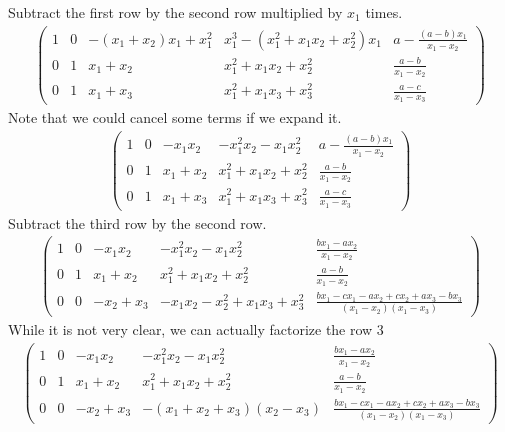 Subtract the first row by the second row multiplied by $ x_1 $ times.
\begin{eqnarray*}
\left(\begin{array}{rrrr|r}
1 & 0 & -{\left(x_{1} + x_{2}\right)} x_{1} + x_{1}^{2} & x_{1}^{3} - {\left(x_{1}^{2} + x_{1} x_{2} + x_{2}^{2}\right)} x_{1} & a - \frac{{\left(a - b\right)} x_{1}}{x_{1} - x_{2}} \\
0 & 1 & x_{1} + x_{2} & x_{1}^{2} + x_{1} x_{2} + x_{2}^{2} & \frac{a - b}{x_{1} - x_{2}} \\
0 & 1 & x_{1} + x_{3} & x_{1}^{2} + x_{1} x_{3} + x_{3}^{2} & \frac{a - c}{x_{1} - x_{3}}
\end{array}\right)
\end{eqnarray*}
Note that we could cancel some terms if we expand it.
\begin{eqnarray*}
\left(\begin{array}{rrrr|r}
1 & 0 & -x_{1} x_{2} & -x_{1}^{2} x_{2} - x_{1} x_{2}^{2} & a - \frac{{\left(a - b\right)} x_{1}}{x_{1} - x_{2}} \\
0 & 1 & x_{1} + x_{2} & x_{1}^{2} + x_{1} x_{2} + x_{2}^{2} & \frac{a - b}{x_{1} - x_{2}} \\
0 & 1 & x_{1} + x_{3} & x_{1}^{2} + x_{1} x_{3} + x_{3}^{2} & \frac{a - c}{x_{1} - x_{3}}
\end{array}\right)
\end{eqnarray*}
Subtract the third row by the second row.
\begin{eqnarray*}
\left(\begin{array}{rrrr|r}
1 & 0 & -x_{1} x_{2} & -x_{1}^{2} x_{2} - x_{1} x_{2}^{2} & \frac{b x_{1} - a x_{2}}{x_{1} - x_{2}} \\
0 & 1 & x_{1} + x_{2} & x_{1}^{2} + x_{1} x_{2} + x_{2}^{2} & \frac{a - b}{x_{1} - x_{2}} \\
0 & 0 & -x_{2} + x_{3} & -x_{1} x_{2} - x_{2}^{2} + x_{1} x_{3} + x_{3}^{2} & \frac{b x_{1} - c x_{1} - a x_{2} + c x_{2} + a x_{3} - b x_{3}}{{\left(x_{1} - x_{2}\right)} {\left(x_{1} - x_{3}\right)}}
\end{array}\right)
\end{eqnarray*}
While it is not very clear, we can actually factorize the row 3 
\begin{eqnarray*}
\left(\begin{array}{rrrr|r}
1 & 0 & -x_{1} x_{2} & -x_{1}^{2} x_{2} - x_{1} x_{2}^{2} & \frac{b x_{1} - a x_{2}}{x_{1} - x_{2}} \\
0 & 1 & x_{1} + x_{2} & x_{1}^{2} + x_{1} x_{2} + x_{2}^{2} & \frac{a - b}{x_{1} - x_{2}} \\
0 & 0 & -x_{2} + x_{3} & -{\left(x_{1} + x_{2} + x_{3}\right)} {\left(x_{2} - x_{3}\right)} & \frac{b x_{1} - c x_{1} - a x_{2} + c x_{2} + a x_{3} - b x_{3}}{{\left(x_{1} - x_{2}\right)} {\left(x_{1} - x_{3}\right)}}
\end{array}\right)
\end{eqnarray*}
